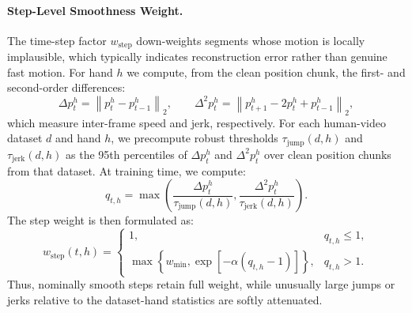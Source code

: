 \documentclass{llmxive}
\begin{document}

\paragraph{Step-Level Smoothness Weight.}
The time-step factor $w_{\mathrm{step}}$ down-weights segments whose motion is locally implausible, which typically indicates reconstruction error rather than genuine fast motion. For hand $h$ we compute, from the clean position chunk, the first- and second-order differences:
\begin{equation}
\Delta p_t^{h} = \left\|p_t^{h} - p_{t-1}^{h}\right\|_2,
\qquad
\Delta^2 p_t^{h} =
\left\|p_{t+1}^{h} - 2p_t^{h} + p_{t-1}^{h}\right\|_2,
\end{equation}
which measure inter-frame speed and jerk, respectively. For each human-video dataset $d$ and hand $h$, we precompute robust thresholds $\tau_{\mathrm{jump}}(d,h)$ and $\tau_{\mathrm{jerk}}(d,h)$ as the 95th percentiles of $\Delta p_t^h$ and $\Delta^2 p_t^h$ over clean position chunks from that dataset. At training time, we compute:
\begin{equation}
q_{t,h}
=
\max\!\left(
\frac{\Delta p_t^h}{\tau_{\mathrm{jump}}(d,h)},
\frac{\Delta^2 p_t^h}{\tau_{\mathrm{jerk}}(d,h)}
\right).
\end{equation}
The step weight is then formulated as:
\begin{equation}
w_{\mathrm{step}}(t,h)
=
\begin{cases}
1, & q_{t,h} \le 1,\\
\max\!\left\{w_{\min}, \exp[-\alpha(q_{t,h}-1)]\right\}, & q_{t,h} > 1.
\end{cases}
\end{equation}
Thus, nominally smooth steps retain full weight, while unusually large jumps or jerks relative to the dataset-hand statistics are softly attenuated.
\end{document}
